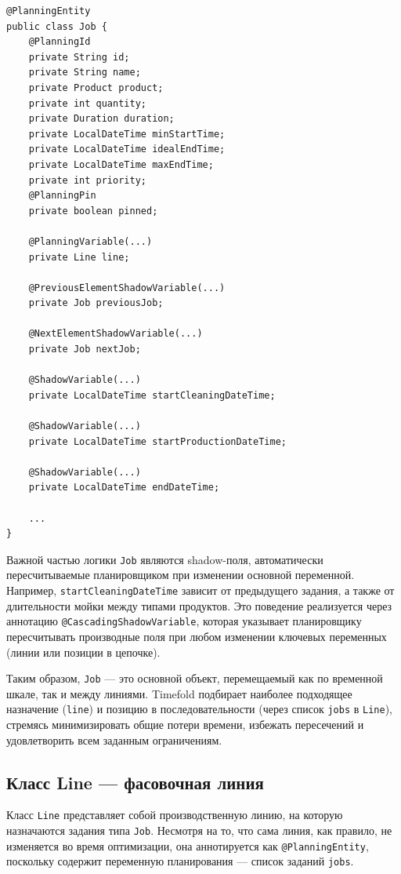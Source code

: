 \vspace{3cm}
\begin{lstlisting}[caption={Класс Job}, label={lst:classJob}]
@PlanningEntity
public class Job {
    @PlanningId
    private String id;
    private String name;
    private Product product;
    private int quantity;
    private Duration duration;
    private LocalDateTime minStartTime;
    private LocalDateTime idealEndTime;
    private LocalDateTime maxEndTime;
    private int priority;
    @PlanningPin
    private boolean pinned;

    @PlanningVariable(...)
    private Line line;

    @PreviousElementShadowVariable(...)
    private Job previousJob;

    @NextElementShadowVariable(...)
    private Job nextJob;

    @ShadowVariable(...)
    private LocalDateTime startCleaningDateTime;

    @ShadowVariable(...)
    private LocalDateTime startProductionDateTime;

    @ShadowVariable(...)
    private LocalDateTime endDateTime;

    ...
}
\end{lstlisting}

Важной частью логики \texttt{Job} являются shadow-поля, автоматически пересчитываемые планировщиком при изменении основной переменной. Например, \texttt{startCleaningDateTime} зависит от предыдущего задания, а также от длительности мойки между типами продуктов. Это поведение реализуется через аннотацию \texttt{@CascadingShadowVariable}, которая указывает планировщику пересчитывать производные поля при любом изменении ключевых переменных (линии или позиции в цепочке).

Таким образом, \texttt{Job} — это основной объект, перемещаемый как по временной шкале, так и между линиями. Timefold подбирает наиболее подходящее назначение (\texttt{line}) и позицию в последовательности (через список \texttt{jobs} в \texttt{Line}), стремясь минимизировать общие потери времени, избежать пересечений и удовлетворить всем заданным ограничениям.

\subsection*{Класс Line — фасовочная линия}

Класс \texttt{Line} представляет собой производственную линию, на которую назначаются задания типа \texttt{Job}. Несмотря на то, что сама линия, как правило, не изменяется во время оптимизации, она аннотируется как \texttt{@PlanningEntity}, поскольку содержит переменную планирования — список заданий \texttt{jobs}.

